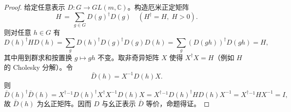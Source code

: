 \begin{proof}
    给定任意表示 $D: G\to GL(m,\mathbb{C})$。构造厄米正定矩阵
    \begin{equation}
        H \,=\, \sum_{g\in G} D(g)^\dagger D(g) \quad (H^\dagger=H,\;H>0).
    \end{equation}
    则对任意 $h\in G$ 有
    \begin{equation}
        D(h)^\dagger H D(h) = \sum_{g} D(h)^\dagger D(g)^\dagger D(g) D(h) = \sum_{g} (D(gh))^\dagger D(gh) = H,
    \end{equation}
    其中用到群求和按置换 $g\mapsto gh$ 不变。取非奇异矩阵 $X$ 使得 $X^\dagger X=H$（例如 $H$ 的 Cholesky 分解）。令
    \begin{equation}
        \bar D(h) = X^{-1} D(h) X.
    \end{equation}
    则
    \begin{equation}
        \bar D(h)^\dagger \bar D(h) = X^\dagger{}^{-1} D(h)^\dagger X^\dagger X^{-1} D(h) X = X^\dagger{}^{-1} D(h)^\dagger H D(h) X^{-1} = X^\dagger{}^{-1} H X^{-1} = I,
    \end{equation}
    故 $\bar D(h)$ 为幺正矩阵。因而 $D$ 与幺正表示 $\bar D$ 等价，命题得证。
\end{proof}

